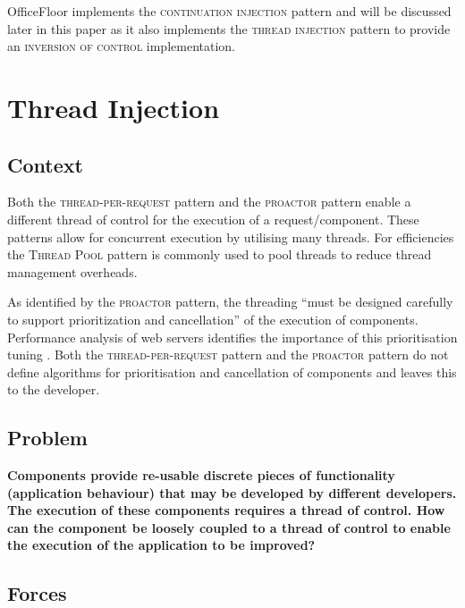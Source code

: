 \documentclass[prodmode]{style/acmlarge}
\begin{document}
OfficeFloor \cite{officefloor} implements the \textsc{continuation injection}
pattern and will be discussed later in this paper as it also implements the
\textsc{thread injection} pattern to provide an \textsc{inversion of control}
implementation.



\section{Thread Injection}


\subsection{Context}

Both the \textsc{thread-per-request} pattern \cite{thread-per-request} and the
\textsc{proactor} pattern \cite{proactor} enable a different thread of control
for the execution of a request/component.  These patterns allow for concurrent
execution by utilising many threads.  For efficiencies the \textsc{Thread Pool}
pattern \cite{thread-per-request} is commonly used to pool threads to reduce
thread management overheads.

As identified by the \textsc{proactor} pattern, the threading ``must be designed
carefully to support prioritization and cancellation'' \cite[p. 8]{proactor} of
the execution of components.  Performance analysis of web servers identifies the
importance of this prioritisation tuning
\cite{tuning-important,low-server-footprint,tuning-os-important}.  Both the
\textsc{thread-per-request} pattern and the \textsc{proactor} pattern do not
define algorithms for prioritisation and cancellation of components and leaves
this to the developer.


\subsection{Problem}

\textbf{Components provide re-usable discrete pieces of functionality
(application behaviour) that may be developed by different developers.  The
execution of these components requires a thread of control.  How can the
component be loosely coupled to a thread of control to enable the execution of
the application to be improved?}


\subsection{Forces}
\end{document}
